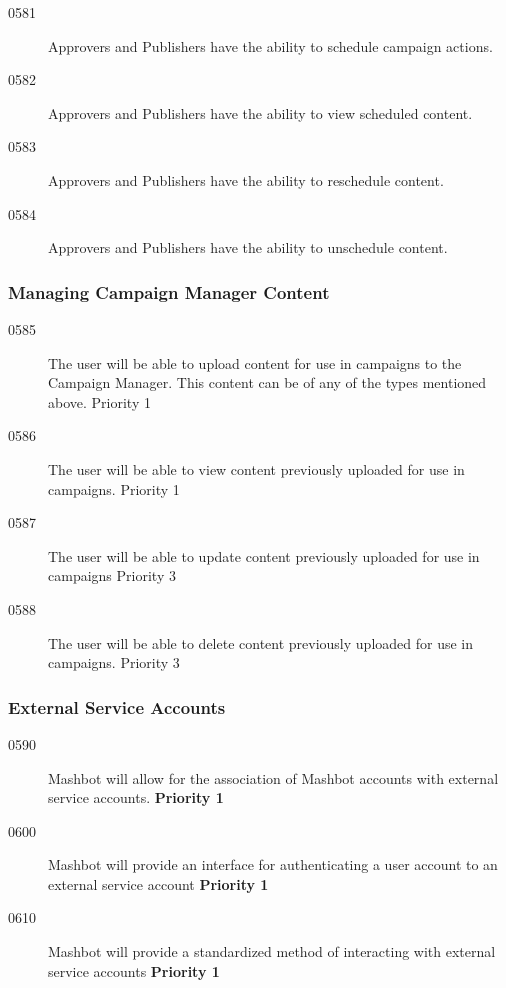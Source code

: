 \documentclass{article}
\begin{document}
\begin{description}
\begin{description}
\item[0581] Approvers and Publishers have the ability to schedule
  campaign actions.
\item[0582] Approvers and Publishers have the ability to view
  scheduled content.
\item[0583] Approvers and Publishers have the ability to reschedule
  content.
\item[0584] Approvers and Publishers have the ability to unschedule content.

\end{description}

\subsubsection{Managing Campaign Manager Content}

\begin{description}
\item[0585] The user will be able to upload content for use in
  campaigns to the Campaign Manager. This content can be of any of the
  types mentioned above. {Priority 1}
\item[0586] The user will be able to view content previously uploaded
  for use in campaigns. {Priority 1}
\item[0587] The user will be able to update content previously
  uploaded for use in campaigns {Priority 3}
\item[0588] The user will be able to delete content previously
  uploaded for use in campaigns. {Priority 3}
\end{description}

\subsubsection{External Service Accounts} %

\begin{description}
\item[0590] Mashbot will allow for the association of Mashbot accounts with
  external service accounts. \textbf{Priority 1}
\item[0600] Mashbot will provide an interface for authenticating a user
  account to an external service account \textbf{Priority 1}
\item[0610] Mashbot will provide a standardized method of interacting with
  external service accounts \textbf{Priority 1}
\end{description}


\end{description}
\end{document}
